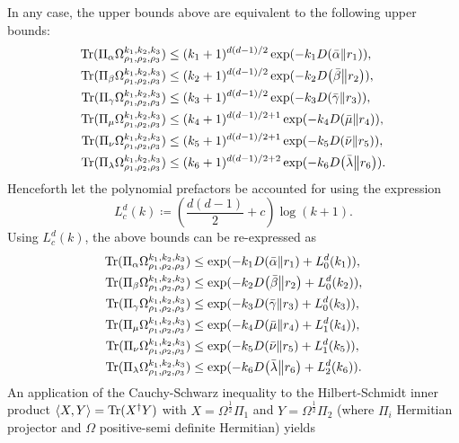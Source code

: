 \documentclass[notitlepage]{article}
\begin{document}
In any case, the upper bounds above are equivalent to the following upper bounds:
\begin{align}
    \operatorname{Tr}(\Pi_{\alpha} \Omega_{\rho_1,\rho_2,\rho_3}^{k_1, k_2, k_3}) &\leq (k_1 + 1)^{d(d-1)/2} \exp(-k_1 D\!\left(\bar \alpha\middle\|r_1\right)), \\
    \operatorname{Tr}(\Pi_{\beta} \Omega_{\rho_1,\rho_2,\rho_3}^{k_1, k_2, k_3}) &\leq (k_2 + 1)^{d(d-1)/2} \exp(-k_2 D\!\left(\bar \beta\middle\|r_2\right)), \\
    \operatorname{Tr}(\Pi_{\gamma} \Omega_{\rho_1,\rho_2,\rho_3}^{k_1, k_2, k_3}) &\leq (k_3 + 1)^{d(d-1)/2} \exp(-k_3 D\!\left(\bar \gamma\middle\|r_3\right)), \\
    \operatorname{Tr}(\Pi_{\mu} \Omega_{\rho_1,\rho_2,\rho_3}^{k_1, k_2, k_3}) &\leq (k_4+1)^{d(d-1)/2+1} \exp(-k_4 D\!\left(\bar \mu\middle\|r_4\right)), \\
    \operatorname{Tr}(\Pi_{\nu} \Omega_{\rho_1,\rho_2,\rho_3}^{k_1, k_2, k_3}) &\leq (k_5+1)^{d(d-1)/2+1} \exp(-k_5 D\!\left(\bar \nu\middle\|r_5\right)), \\
    \operatorname{Tr}(\Pi_{\lambda} \Omega_{\rho_1,\rho_2,\rho_3}^{k_1, k_2, k_3}) &\leq (k_6+1)^{d(d-1)/2+2} \exp(-k_6 D\!\left(\bar \lambda\middle\|r_6\right)).
\end{align}
Henceforth let the polynomial prefactors be accounted for using the expression
\begin{equation}
    L^d_c(k) \coloneqq \left(\frac{d(d-1)}{2} + c\right)\log (k+1).
\end{equation}
Using $L^d_c(k)$, the above bounds can be re-expressed as
\begin{align}
    \operatorname{Tr}(\Pi_{\alpha} \Omega_{\rho_1,\rho_2,\rho_3}^{k_1, k_2, k_3}) &\leq \exp(-k_1 D\!\left(\bar \alpha\middle\|r_1\right) + L^d_0(k_1)), \\
    \operatorname{Tr}(\Pi_{\beta} \Omega_{\rho_1,\rho_2,\rho_3}^{k_1, k_2, k_3}) &\leq \exp(-k_2 D\!\left(\bar \beta\middle\|r_2\right) + L^d_0(k_2)), \\
    \operatorname{Tr}(\Pi_{\gamma} \Omega_{\rho_1,\rho_2,\rho_3}^{k_1, k_2, k_3}) &\leq \exp(-k_3 D\!\left(\bar \gamma\middle\|r_3\right) + L^d_0(k_3)), \\
    \operatorname{Tr}(\Pi_{\mu} \Omega_{\rho_1,\rho_2,\rho_3}^{k_1, k_2, k_3}) &\leq \exp(-k_4 D\!\left(\bar \mu\middle\|r_4\right) + L^d_1(k_4)), \\
    \operatorname{Tr}(\Pi_{\nu} \Omega_{\rho_1,\rho_2,\rho_3}^{k_1, k_2, k_3}) &\leq \exp(-k_5 D\!\left(\bar \nu\middle\|r_5\right) + L^d_1(k_5)), \\
    \operatorname{Tr}(\Pi_{\lambda} \Omega_{\rho_1,\rho_2,\rho_3}^{k_1, k_2, k_3}) &\leq \exp(-k_6 D\!\left(\bar \lambda\middle\|r_6\right) + L^d_2(k_6)).
\end{align}
An application of the Cauchy-Schwarz inequality to the Hilbert-Schmidt inner product $\braket{X,Y} = \operatorname{Tr}(X^{\dagger} Y)$ with $X = \Omega^{\frac{1}{2}}\Pi_1$ and $Y = \Omega^{\frac{1}{2}}\Pi_2$ (where $\Pi_i$ Hermitian projector and $\Omega$ positive-semi definite Hermitian) yields
\end{document}
